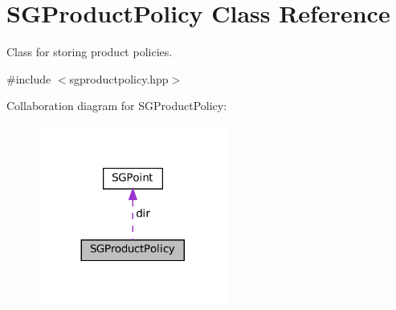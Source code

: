 \hypertarget{classSGProductPolicy}{}\section{S\+G\+Product\+Policy Class Reference}
\label{classSGProductPolicy}


Class for storing product policies.  




{\ttfamily \#include $<$sgproductpolicy.\+hpp$>$}



Collaboration diagram for S\+G\+Product\+Policy\+:
\nopagebreak
\begin{figure}[H]
\begin{center}
\leavevmode
\includegraphics[width=176pt]{classSGProductPolicy__coll__graph}
\end{center}
\end{figure}
